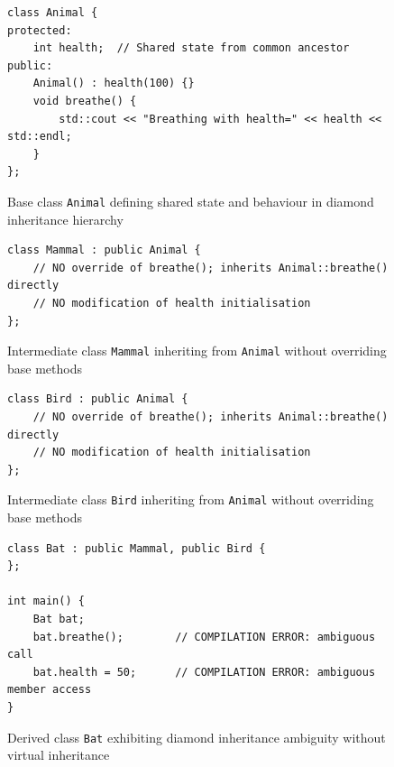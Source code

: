 \begin{figure}[htbp]
    \centering
    \begin{verbatim}
class Animal {
protected:
    int health;  // Shared state from common ancestor
public:
    Animal() : health(100) {}
    void breathe() {
        std::cout << "Breathing with health=" << health << std::endl;
    }
};
    \end{verbatim}
    \caption{Base class \texttt{Animal} defining shared state and behaviour in diamond inheritance hierarchy}
    \label{fig:diamond-animal}
\end{figure}

\begin{figure}[htbp]
    \centering
    \begin{verbatim}
class Mammal : public Animal {
    // NO override of breathe(); inherits Animal::breathe() directly
    // NO modification of health initialisation
};
    \end{verbatim}
    \caption{Intermediate class \texttt{Mammal} inheriting from \texttt{Animal} without overriding base methods}
    \label{fig:diamond-mammal}
\end{figure}

\begin{figure}[htbp]
    \centering
    \begin{verbatim}
class Bird : public Animal {
    // NO override of breathe(); inherits Animal::breathe() directly
    // NO modification of health initialisation
};
    \end{verbatim}
    \caption{Intermediate class \texttt{Bird} inheriting from \texttt{Animal} without overriding base methods}
    \label{fig:diamond-bird}
\end{figure}

\begin{figure}[htbp]
    \centering
    \begin{verbatim}
class Bat : public Mammal, public Bird {
};

int main() {
    Bat bat;
    bat.breathe();        // COMPILATION ERROR: ambiguous call
    bat.health = 50;      // COMPILATION ERROR: ambiguous member access
}
    \end{verbatim}
    \caption{Derived class \texttt{Bat} exhibiting diamond inheritance ambiguity without virtual inheritance}
    \label{fig:diamond-bat}
\end{figure}

